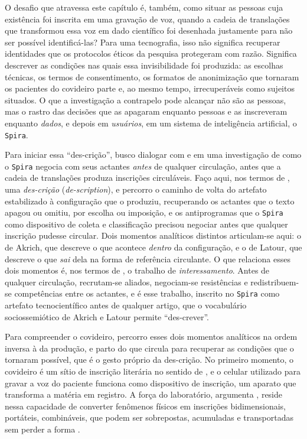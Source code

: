 O desafio que atravessa este capítulo é, também, como situar as pessoas cuja existência foi inscrita em uma gravação de voz, quando a cadeia de translações que transformou essa voz em dado científico foi desenhada justamente para não ser possível identificá-las? Para uma tecnografia, isso não significa recuperar identidades que os protocolos éticos da pesquisa protegeram com razão. Significa descrever as condições nas quais essa invisibilidade foi produzida: as escolhas técnicas, os termos de consentimento, os formatos de anonimização que tornaram os pacientes do covideiro parte e, ao mesmo tempo, irrecuperáveis como sujeitos situados. O que a investigação a contrapelo pode alcançar não são as pessoas, mas o rastro das decisões que as apagaram enquanto pessoas e as inscreveram enquanto \textit{dados}, e depois em \textit{usuários}, em um sistema de inteligência artificial, o \texttt{Spira}.

Para iniciar essa \enquote{des-crição}, busco dialogar com \textcite{Akrich1992Description, AkrichLatour1992Convenient, AkrichCallonLatour2002} e \textcite{Latour1997VidaLaboratorio, Latour2011CienciaEmAcao} em uma investigação de como o \texttt{Spira} negocia com seus actantes \textit{antes} de qualquer circulação, antes que a cadeia de translações produza inscrições circuláveis. Faço aqui, nos termos de \textcite{Akrich1992Description}, uma \textit{des-crição} (\textit{de-scription}), e percorro o caminho de volta do artefato estabilizado à configuração que o produziu, recuperando os actantes que o texto apagou ou omitiu, por escolha ou imposição, e os antiprogramas que o \texttt{Spira} como dispositivo de coleta e classificação precisou negociar antes que qualquer inscrição pudesse circular. Dois momentos analíticos distintos articulam-se aqui: o de Akrich, que descreve o que acontece \textit{dentro} da configuração, e o de Latour, que descreve o que \textit{sai} dela na forma de referência circulante. O que relaciona esses dois momentos é, nos termos de \textcite{AkrichCallonLatour2002}, o trabalho de \textit{interessamento}. Antes de qualquer circulação, recrutam-se aliados, negociam-se resistências e redistribuem-se competências entre os actantes, e é esse trabalho, inscrito no \texttt{Spira} como artefato tecnocientífico antes de qualquer artigo, que o vocabulário sociossemiótico de Akrich e Latour permite \enquote{des-crever}.

Para compreender o covideiro, percorro esses dois momentos analíticos na ordem inversa à da produção, e parto do que circula para recuperar as condições que o tornaram possível, que é o gesto próprio da des-crição. No primeiro momento, o covideiro é um sítio de inscrição literária no sentido de \textcite{Latour1997VidaLaboratorio}, e o celular utilizado para gravar a voz do paciente funciona como dispositivo de inscrição, um aparato que transforma a matéria em registro. A força do laboratório, argumenta \textcite{Latour1997VidaLaboratorio}, reside nessa capacidade de converter fenômenos físicos em inscrições bidimensionais, portáteis, combináveis, que podem ser sobrepostas, acumuladas e transportadas sem perder a forma \parencite{Latour1986Visualization}.

